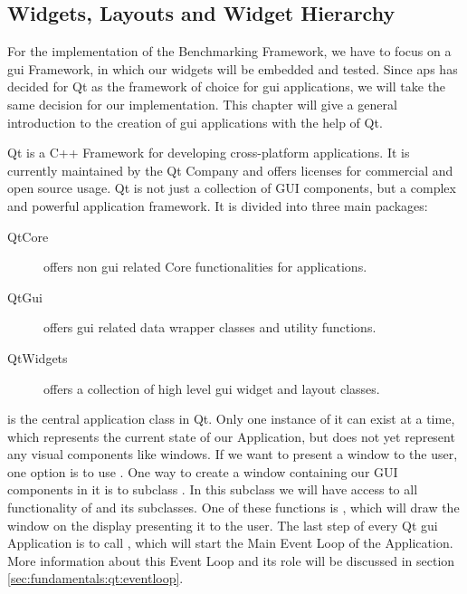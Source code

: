 
\subsection{Widgets, Layouts and Widget Hierarchy}
\label{sec:fundamentals:qt:basics}

For the implementation of the Benchmarking Framework, we have to focus on a
\gls{gui} Framework, in which our widgets will be embedded and tested. Since
\gls{aps} has decided for Qt as the framework of choice for \gls{gui}
applications, we will take the same decision for our implementation. This
chapter will give a general introduction to the creation of \gls{gui}
applications with the help of Qt.

Qt is a C++ Framework for developing cross-platform applications. It is
currently maintained by the Qt Company and offers licenses for commercial and
open source usage. Qt is not just a collection of GUI components, but a complex
and powerful application framework. It is divided into three main packages:

\begin{description}
    
    \item[QtCore] offers non \gls{gui} related Core functionalities for
        applications.  

    \item[QtGui] offers \gls{gui} related data wrapper
        classes and utility functions.
    
    \item[QtWidgets] offers a collection of high level \gls{gui} widget and
        layout classes.  

\end{description}

 is the central application class in
Qt. Only one instance of it can exist at a time, which represents the current
state of our Application, but does not yet represent any visual components like
windows. If we want to present a window to the user, one option is to use
. One way to create a window
containing our GUI components in it is to subclass
. In this subclass we will have access to all
functionality of  and its subclasses. One of
these functions is , which will
draw the window on the display presenting it to the user. The last step of every
Qt \gls{gui} Application is to call
, which will start the Main
Event Loop of the Application. More information about this Event Loop and its
role will be discussed in section \ref{sec:fundamentals:qt:eventloop}.

